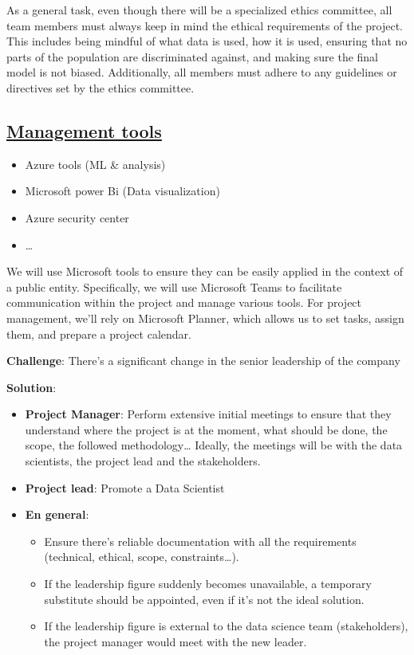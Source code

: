 As a general task, even though there will be a specialized ethics committee,
all team members must always keep in mind the ethical requirements of the project.
This includes being mindful of what data is used, how it is used,
ensuring that no parts of the population are discriminated against, and making sure the final model is not biased.
Additionally, all members must adhere to any guidelines or directives set by the ethics committee.

\subsection{\href{https://www.microsoft.com/es-es/microsoft-365/planner/microsoft-planner}{Management tools}}\label{subsec:management-tools}
\begin{itemize}
    \item Azure tools (ML \& analysis)
    \item Microsoft power Bi (Data visualization)
    \item Azure security center
    \item \dots
\end{itemize}
We will use Microsoft tools to ensure they can be easily applied in the context of a public entity.
Specifically, we will use Microsoft Teams to facilitate communication within the project and manage various tools.
For project management, we’ll rely on Microsoft Planner, which allows us to set tasks, assign them, and prepare a project calendar.

\begin{warning}
    \textbf{Challenge}: There’s a significant change in the senior leadership of the company

    \textbf{Solution}:

    \begin{itemize}
        \item \textbf{Project Manager}: Perform extensive initial meetings to ensure that they understand where the project is at the moment, what should be done, the scope, the followed methodology… Ideally, the meetings will be with the data scientists, the project lead and the stakeholders.
        \item \textbf{Project lead}: Promote a Data Scientist
        \item \textbf{En general}:
        \begin{itemize}
            \item Ensure there's reliable documentation with all the requirements (technical, ethical, scope, constraints…).
            \item If the leadership figure suddenly becomes unavailable, a temporary substitute should be appointed, even if it’s not the ideal solution.
            \item If the leadership figure is external to the data science team (stakeholders), the project manager would meet with the new leader.
        \end{itemize}
    \end{itemize}
\end{warning}